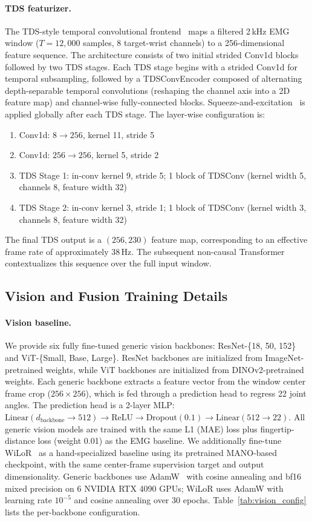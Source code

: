 \documentclass[letterpaper]{article} %
\begin{document}
\paragraph{TDS featurizer.}
The TDS-style temporal convolutional frontend~\citep{tds} maps a filtered
2\,kHz EMG window ($T=12{,}000$ samples, 8 target-wrist channels) to a
256-dimensional feature sequence. The architecture consists of two initial
strided Conv1d blocks followed by two TDS stages. Each TDS stage begins with a
strided Conv1d for temporal subsampling, followed by a TDSConvEncoder composed
of alternating depth-separable temporal convolutions (reshaping the channel
axis into a 2D feature map) and channel-wise fully-connected blocks.
Squeeze-and-excitation~\citep{senet} is applied globally after each TDS stage.
The layer-wise configuration is:
\begin{enumerate}[leftmargin=1.5em,nosep]
    \item Conv1d: $8 \to 256$, kernel 11, stride 5
    \item Conv1d: $256 \to 256$, kernel 5, stride 2
    \item TDS Stage 1: in-conv kernel 9, stride 5; 1 block of TDSConv (kernel width 5, channels 8, feature width 32)
    \item TDS Stage 2: in-conv kernel 3, stride 1; 1 block of TDSConv (kernel width 3, channels 8, feature width 32)
\end{enumerate}
The final TDS output is a $(256,230)$ feature map, corresponding to an
effective frame rate of approximately 38\,Hz. The subsequent non-causal
Transformer contextualizes this sequence over the full input window.

\subsection{Vision and Fusion Training Details}
\label{app:training_details_vision}

\paragraph{Vision baseline.}
We provide six fully fine-tuned generic vision backbones: ResNet-\{18, 50, 152\} and ViT-\{Small, Base, Large\}. ResNet backbones are initialized from ImageNet-pretrained weights, while ViT backbones are initialized from DINOv2-pretrained weights. Each generic backbone extracts a feature vector from the window center frame crop ($256\times256$), which is fed through a prediction head to regress 22 joint angles. The prediction head is a 2-layer MLP: $\text{Linear}(d_{\text{backbone}} \to 512) \to \text{ReLU} \to \text{Dropout}(0.1) \to \text{Linear}(512 \to 22)$. All generic vision models are trained with the same L1 (MAE) loss plus fingertip-distance loss (weight 0.01) as the EMG baseline. We additionally fine-tune WiLoR~\citep{wilor} as a hand-specialized baseline using its pretrained MANO-based checkpoint, with the same center-frame supervision target and output dimensionality. Generic backbones use AdamW~\citep{adamw} with cosine annealing and bf16 mixed precision on 6 NVIDIA RTX 4090 GPUs; WiLoR uses AdamW with learning rate $10^{-5}$ and cosine annealing over 30 epochs. Table~\ref{tab:vision_config} lists the per-backbone configuration.
\end{document}
